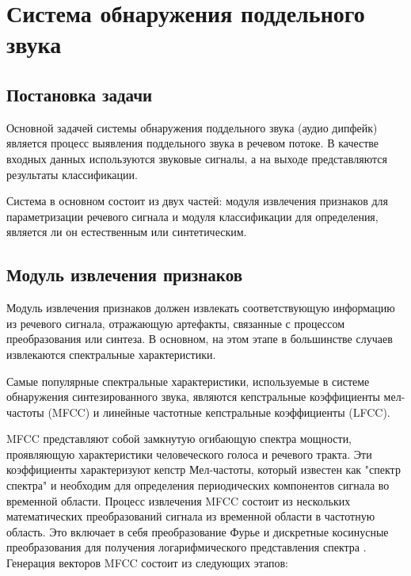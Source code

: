 \chapter{Система обнаружения поддельного звука}

\section{Постановка задачи}

Основной задачей системы обнаружения поддельного звука (аудио дипфейк) является процесс выявления поддельного звука в речевом потоке. В качестве входных данных используются звуковые сигналы, а на выходе представляются результаты классификации.

Система в основном состоит из двух частей: модуля извлечения признаков для параметризации речевого сигнала и модуля классификации для определения, является ли он естественным или синтетическим.


\section{Модуль извлечения признаков}

Модуль извлечения признаков должен извлекать соответствующую информацию из речевого сигнала, отражающую артефакты, связанные с процессом преобразования или синтеза. В основном, на этом этапе в большинстве случаев извлекаются спектральные характеристики.

Самые популярные спектральные характеристики, используемые в системе обнаружения синтезированного звука, являются кепстральные коэффициенты мел-частоты (MFCC) и линейные частотные кепстральные коэффициенты (LFCC).

MFCC \cite{vergin1999generalized} представляют собой замкнутую огибающую спектра мощности, проявляющую характеристики человеческого голоса и речевого тракта. Эти коэффициенты характеризуют кепстр Мел-частоты, который известен как "спектр спектра" и необходим для определения периодических компонентов сигнала во временной области. Процесс извлечения MFCC состоит из нескольких математических преобразований сигнала из временной области в частотную область. Это включает в себя преобразование Фурье и дискретные косинусные преобразования для получения логарифмического представления спектра \cite{rao2017speech}. Генерация векторов MFCC состоит из следующих этапов:

